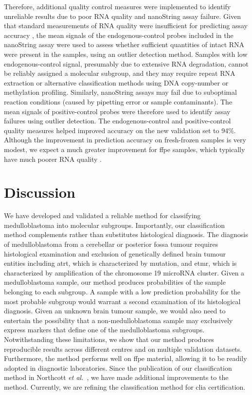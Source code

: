 Therefore, additional quality control measures were implemented to identify unreliable results due to poor RNA quality and nanoString assay failure. Given that standard measurements of RNA quality were insufficient for predicting assay accuracy , the mean signals of the endogenous-control probes included in the nanoString assay were used to assess whether sufficient quantities of intact RNA were present in the samples, using an outlier detection method. Samples with low endogenous-control signal, presumably due to extensive RNA degradation, cannot be reliably assigned a molecular subgroup, and they may require repeat RNA extraction or alternative classification methods using DNA copy-number or methylation profiling. Similarly, nanoString assays may fail due to suboptimal reaction conditions (caused by pipetting error or sample contaminants). The mean signals of positive-control probes were therefore used to identify assay failures using outlier detection. The endogenous-control and positive-control quality measures helped improved accuracy on the new validation set to 94\%. Although the improvement in prediction accuracy on fresh-frozen samples is very modest, we expect a much greater improvement for \gls{ffpe} samples, which typically have much poorer RNA quality .

\clearpage

\section{Discussion}

We have developed and validated a reliable method for classifying medulloblastoma into molecular subgroups. Importantly, our classification method complements rather than substitutes histological diagnosis. The diagnosis of medulloblastoma from a cerebellar or posterior fossa tumour requires histological examination and exclusion of genetically defined brain tumour entities including \gls{atrt}, which is characterized by  mutation, and \gls{etmr}, which is characterized by amplification of the chromosome 19 microRNA cluster. Given a medulloblastoma sample, our method produces probabilities of the sample belonging to each subgroup. A sample with a low prediction probability for the most probable subgroup would warrant a second examination of its histological diagnosis. Given an unknown brain tumour sample, we would also need to entertain the possibility that a non-medulloblastoma sample may exclusively express markers that define one of the medulloblastoma subgroups. Notwithstanding these limitations, we show that our method produces reproducible results across different centres and on multiple validation datasets. Furthermore, the method performs well on \gls{ffpe} material, allowing it to be readily adopted in diagnostic laboratories. Since the publication of our classification method in Northcott \emph{et al.}\ , we have made additional improvements to the method. Currently, we are refining the classification method for \gls{clia} certification.

